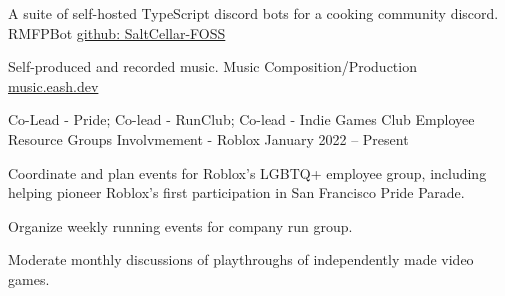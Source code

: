 \documentclass[]{awesome-cv}
\begin{document}
	\vspace{-6mm}
	\projentry
	{A suite of self-hosted TypeScript discord bots for a cooking community discord.}
	{RMFPBot}
	{\href{https://github.com/SaltCellar-FOSS}{github: SaltCellar-FOSS}}
	{}
	{}

	\vspace{-6mm}
	\projentry
	{Self-produced and recorded music.}
	{Music Composition/Production}
	{\href{https://music.eash.dev}{music.eash.dev}}
	{}
	{}
	
	\vspace{-5mm}
	

\vspace{-2mm}
	\cventry
	{Co-Lead - Pride; Co-lead - RunClub; Co-lead - Indie Games Club}
	{Employee Resource Groups Involvmement - Roblox}
	{}
	{January 2022 – Present}
	{\begin{cvitems}
		\item {Coordinate and plan events for Roblox's LGBTQ+ employee group, including helping pioneer Roblox's first participation in San Francisco Pride Parade.}
		\item {Organize weekly running events for company run group.}
		\item {Moderate monthly discussions of playthroughs of independently made video games.}
		\end{cvitems}}

	\vspace{-4mm}

	
\end{document}
